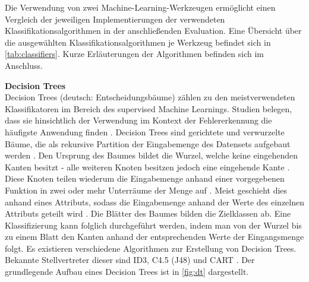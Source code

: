 Die Verwendung von zwei Machine-Learning-Werkzeugen ermöglicht einen Vergleich der jeweiligen Implementierungen der verwendeten Klassifikationsalgorithmen in der anschließenden Evaluation. Eine Übersicht über die ausgewählten Klassifikationsalgorithmen je Werkzeug befindet sich in \autoref{tab:classifiers}. Kurze Erläuterungen der Algorithmen befinden sich im Anschluss.

\begin{table}
\centering
\caption{Zum Training verwendete Klassifikationsalgorithmen}
\label{tab:classifiers}
\end{table}

\label{algorithms}
\textbf{Decision Trees\medskip}\\
Decision Trees (deutsch: Entscheidungsbäume) zählen zu den meistverwendeten Klassifikatoren im Bereich des supervised Machine Learnings. Studien belegen, dass sie hinsichtlich der Verwendung im Kontext der Fehlererkennung die häufigste Anwendung finden \cite{Son2019}. Decision Trees sind gerichtete und verwurzelte Bäume, die als rekursive Partition der Eingabemenge des Datensets aufgebaut werden \cite{Rokach2005}. Den Ursprung des Baumes bildet die Wurzel, welche keine eingehenden Kanten besitzt - alle weiteren Knoten besitzen jedoch eine eingehende Kante \cite{Rokach2005}. Diese Knoten teilen wiederum die Eingabemenge anhand einer vorgegebenen Funktion in zwei oder mehr Unterräume der Menge auf \cite{Rokach2005}. Meist geschieht dies anhand eines Attributs, sodass die Eingabemenge anhand der Werte des einzelnen Attributs geteilt wird \cite{Rokach2005}. Die Blätter des Baumes bilden die Zielklassen ab. Eine Klassifizierung kann folglich durchgeführt werden, indem man von der Wurzel bis zu einem Blatt den Kanten anhand der entsprechenden Werte der Eingangsmenge folgt. Es existieren verschiedene Algorithmen zur Erstellung von Decision Trees. Bekannte Stellvertreter dieser sind ID3, C4.5 (J48) und CART \cite{Rokach2005}. Der grundlegende Aufbau eines Decision Trees ist in \autoref{fig:dt} dargestellt.

